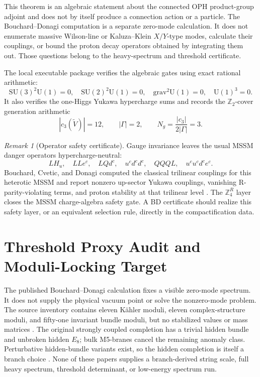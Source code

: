 \documentclass[11pt]{article}
\theoremstyle{remark}
\newtheorem{remark}[theorem]{Remark}
\theoremstyle{plain}
\newcommand{\SU}{\mathrm{SU}}
\newcommand{\U}{\mathrm{U}}
\newcommand{\Z}{\mathbb Z}
\newcommand{\ZfourR}{\mathbb Z_4^R}
\begin{document}
This theorem is an algebraic statement about the connected OPH product-group adjoint and does not
by itself produce a connection action or a particle. The Bouchard--Donagi computation is a
separate zero-mode calculation. It does not enumerate massive
Wilson-line or Kaluza--Klein \(X/Y\)-type modes, calculate their couplings, or bound the proton
decay operators obtained by integrating them out. Those questions belong to the heavy-spectrum
and threshold certificate.

The local executable package verifies the algebraic gates using exact rational arithmetic:
\[
\SU(3)^2\U(1)=0,\quad
\SU(2)^2\U(1)=0,\quad
\mathrm{grav}^2\U(1)=0,\quad
\U(1)^3=0.
\]
It also verifies the one-Higgs Yukawa hypercharge sums and records the \(\Z_2\)-cover generation
arithmetic
\[
|c_3(\widetilde V)|=12,\qquad |\Gamma|=2,\qquad
N_g=\frac{|c_3|}{2|\Gamma|}=3.
\]

\begin{remark}[Operator safety certificate]
Gauge invariance leaves the usual MSSM danger operators hypercharge-neutral:
\[
LH_u,\quad LLe^c,\quad LQd^c,\quad u^cd^cd^c,\quad QQQL,\quad u^cu^cd^ce^c.
\]
Bouchard, Cvetic, and Donagi computed the classical trilinear couplings for this heterotic MSSM
and report nonzero up-sector Yukawa couplings, vanishing R-parity-violating terms, and proton
stability at that trilinear level \cite{BouchardCveticDonagi2006}. The \(\ZfourR\) layer closes
the MSSM charge-algebra safety gate. A BD certificate should realize this safety layer, or an
equivalent selection rule, directly in the compactification data.
\end{remark}

\section{Threshold Proxy Audit and Moduli-Locking Target}\label{sec:bd-threshold-proxy}

The published Bouchard--Donagi calculation fixes a visible zero-mode spectrum. It does not supply
the physical vacuum point or solve the nonzero-mode problem. The source inventory contains eleven
K\"ahler moduli, eleven complex-structure moduli, and fifty-one invariant bundle moduli, but no
stabilized values or mass matrices \cite{BouchardCveticDonagi2006,BouchardDonagi2008}. The
original strongly coupled completion has a trivial hidden bundle and unbroken hidden \(E_8\);
bulk M5-branes cancel the remaining anomaly class. Perturbative hidden-bundle variants exist, so
the hidden completion is itself a branch choice \cite{BouchardDonagi2005,BouchardDonagi2008}.
None of these papers supplies a
branch-derived string scale, full heavy spectrum, threshold determinant, or low-energy spectrum
run.
\end{document}
